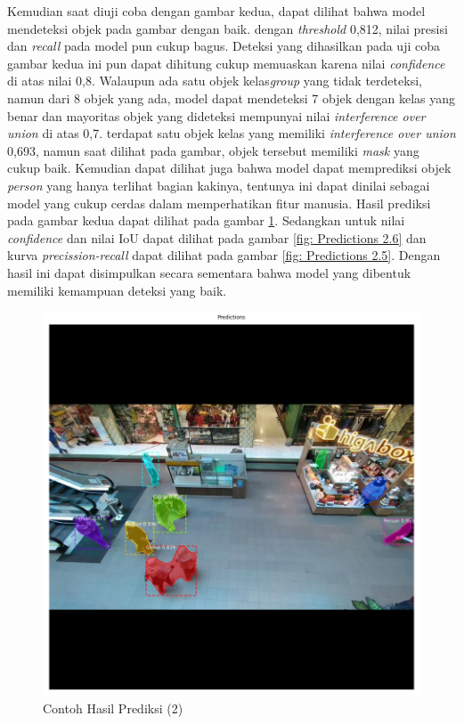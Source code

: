 Kemudian saat diuji coba dengan gambar kedua, dapat dilihat bahwa model mendeteksi objek pada gambar
dengan baik. dengan \textit{threshold} 0,812, nilai presisi dan \textit{recall} pada model pun cukup
bagus. Deteksi yang dihasilkan pada uji coba gambar kedua ini pun dapat dihitung cukup memuaskan 
karena nilai \textit{confidence} di atas nilai 0,8. Walaupun ada satu objek kelas\textit{group} yang 
tidak terdeteksi, namun dari 8 objek yang ada, model dapat mendeteksi 7 objek dengan kelas yang benar
dan mayoritas objek yang dideteksi mempunyai nilai \textit{interference over union} di atas 0,7. terdapat
satu objek kelas yang memiliki \textit{interference over union} 0,693, namun saat dilihat pada gambar,
objek tersebut memiliki \textit{mask} yang cukup baik. Kemudian dapat dilihat juga bahwa model
dapat memprediksi objek \textit{person} yang hanya terlihat bagian kakinya, tentunya ini dapat dinilai
sebagai model yang cukup cerdas dalam memperhatikan fitur manusia. Hasil prediksi pada gambar
kedua dapat dilihat pada gambar \ref{fig: Predictions 2}. Sedangkan untuk nilai \textit{confidence} dan
nilai IoU dapat dilihat pada gambar \ref{fig: Predictions 2.6} dan kurva \textit{precission-recall} dapat 
dilihat pada gambar \ref{fig: Predictions 2.5}. Dengan hasil ini dapat disimpulkan secara sementara
bahwa model yang dibentuk memiliki kemampuan deteksi yang baik.

\begin{figure}[h!]
  \begin{center}
    \includegraphics[width= 0.7\linewidth]{bab4/Contoh Hasil prediksi 3.png}
    \caption{Contoh Hasil Prediksi (2)}
    \label{fig: Predictions 2}
  \end{center}
\end{figure}

